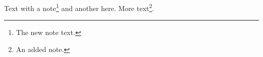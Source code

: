 \documentclass{article}
\begin{document}
Text with a note\footnote{The new note text.} and another here.
More text\footnote{An added note.}.
\end{document}
